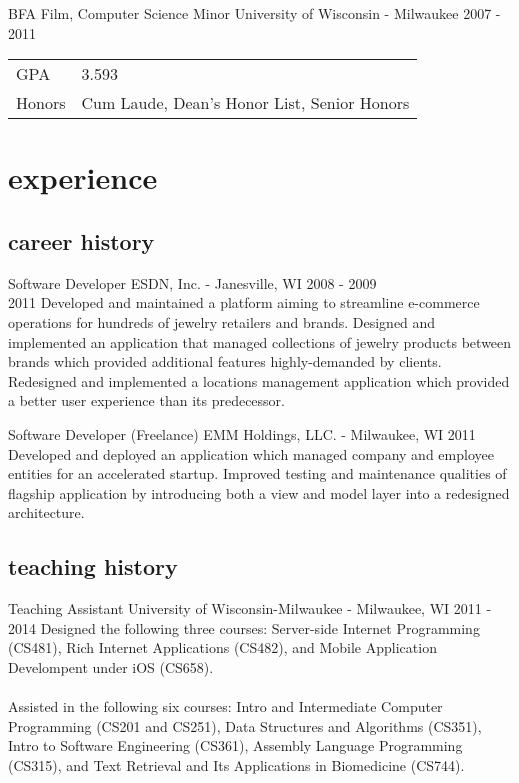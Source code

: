 \documentclass[]{fritz-resume}
\begin{document}
\entry
  {BFA Film, Computer Science Minor}
  {University of Wisconsin - Milwaukee}
  {2007 - 2011}
  {
    \begin{tabular}{>{\raggedleft}p{1.7cm} l}
      GPA    & 3.593 \\
      Honors & Cum Laude, Dean's Honor List, Senior Honors
    \end{tabular}
  }


\section{experience}

\subsection{career history}

\entry
  {Software Developer}
  {ESDN, Inc. - Janesville, WI \vspace{-3mm}}
  {2008 - 2009 \\ 2011}
  {
    Developed and maintained a platform aiming to streamline e-commerce operations for hundreds of jewelry retailers and brands. Designed and implemented an application that managed collections of jewelry products between brands which provided additional features highly-demanded by clients. Redesigned and implemented a locations management application which provided a better user experience than its predecessor.
  }

\entry
  {Software Developer (Freelance)}
  {EMM Holdings, LLC. - Milwaukee, WI}
  {2011}
  {
    Developed and deployed an application which managed company and employee entities for an accelerated startup. Improved testing and maintenance qualities of flagship application by introducing both a view and model layer into a redesigned architecture.
  }

\subsection{teaching history}

\entry
  {Teaching Assistant}
  {University of Wisconsin-Milwaukee - Milwaukee, WI}
  {2011 - 2014}
  {
    Designed the following three courses: Server-side Internet Programming (CS481), Rich Internet Applications (CS482), and Mobile Application Develompent under iOS (CS658). \\\\ Assisted in the following six courses: Intro and Intermediate Computer Programming (CS201 and CS251), Data Structures and Algorithms (CS351), Intro to Software Engineering (CS361), Assembly Language Programming (CS315), and Text Retrieval and Its Applications in Biomedicine (CS744).
  }


\end{document}
